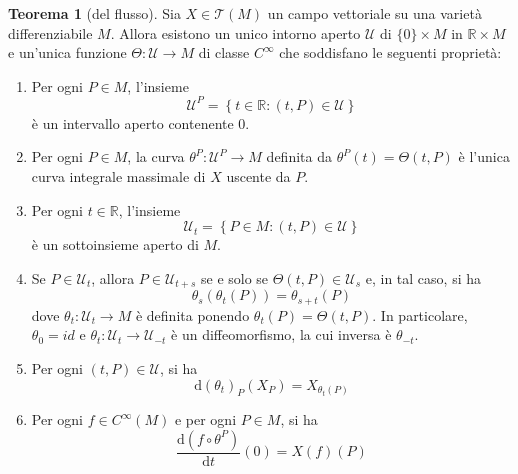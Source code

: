 \documentclass[a4paper,11pt]{article}
\theoremstyle{definition}
\theoremstyle{theorem}
\newtheorem{teorema}{Teorema}[section]
\begin{document}
\begin{teorema}[del flusso]
	Sia $X\in\mathcal{T}(M)$ un campo vettoriale su una varietà differenziabile $M$. Allora esistono un unico intorno aperto $\mathcal{U}$ di $\{0\}\times M$ in $\mathbb{R}\times M$ e un'unica funzione $\Theta\colon \mathcal{U}\to M$ di classe $C^\infty$ che soddisfano le seguenti proprietà:
	\begin{enumerate}
		\item Per ogni $P\in M$, l'insieme
		\[\mathcal{U}^P=\left\{t\in\mathbb{R}:(t,P)\in\mathcal{U}\right\}\]
		è un intervallo aperto contenente 0.
		\item Per ogni $P\in M$, la curva $\theta^P\colon\mathcal{U}^P\to M$ definita da $\theta^P(t)=\Theta(t,P)$ è l'unica curva integrale massimale di $X$ uscente da $P$.
		\item Per ogni $t\in\mathbb{R}$, l'insieme
		\[\mathcal{U}_t=\left\{P\in M:(t,P)\in\mathcal{U}\right\}\]
		è un sottoinsieme aperto di $M$.
		\item Se $P\in\mathcal{U}_t$, allora $P\in\mathcal{U}_{t+s}$ se e solo se $\Theta(t,P)\in\mathcal{U}_s$ e, in tal caso, si ha
		\[\theta_s(\theta_t(P))=\theta_{s+t}(P)\]
		dove $\theta_t\colon\mathcal{U}_t\to M$ è definita ponendo $\theta_t(P)=\Theta(t,P)$. In particolare, $\theta_0=id$ e $\theta_t\colon\mathcal{U}_t\to\mathcal{U}_{-t}$ è un diffeomorfismo, la cui inversa è $\theta_{-t}$.
		\item Per ogni $(t,P)\in\mathcal{U}$, si ha \[\mathrm{d}\left(\theta_t\right)_P(X_P)=X_{\theta_t(P)}\]
		\item Per ogni $f\in C^\infty(M)$ e per ogni $P\in M$, si ha
		\[\frac{\mathrm{d}\left(f\circ\theta^P\right)}{\mathrm{d}t}(0)=X(f)(P)\]
	\end{enumerate}
\end{teorema}
\end{document}
